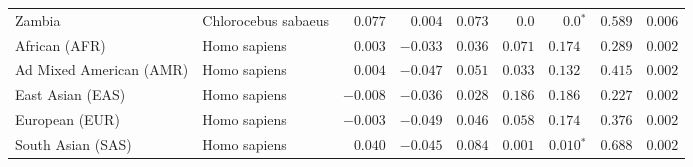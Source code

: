 \begin{center}
\begin{adjustbox}{width = 1\textwidth}
\begin{tabular}{|l|l|r|r|r|r|r|r|r|}
            Zambia        & Chlorocebus sabaeus        & $ 0.077$ & $ 0.004$ & $ 0.073$ & $0.0$ & $\bm{0.0{^*}}$ & $ 0.589$ & $ 0.006$ \\
            African (AFR)               & Homo sapiens        & $ 0.003$ & $-0.033$ & $ 0.036$ & $ 0.071$ & $ 0.174~~$        & $ 0.289$ & $ 0.002$ \\
            Ad Mixed American (AMR)                 & Homo sapiens        & $ 0.004$ & $-0.047$ & $ 0.051$ & $ 0.033$ & $ 0.132~~$        & $ 0.415$ & $ 0.002$ \\
            East Asian (EAS)              & Homo sapiens        & $-0.008$ & $-0.036$ & $ 0.028$ & $ 0.186$ & $ 0.186~~$ & $ 0.227$ & $ 0.002$ \\
            European (EUR)              & Homo sapiens        & $-0.003$ & $-0.049$ & $ 0.046$ & $ 0.058$ & $ 0.174~~$ & $ 0.376$ & $ 0.002$ \\
            South Asian (SAS)              & Homo sapiens        & $ 0.040$ & $-0.045$ & $ 0.084$ & $ 0.001$ & $\bm{ 0.010{^*}}$ & $ 0.688$ & $ 0.002$ \\
            \bottomrule
        \end{tabular}
    \end{adjustbox}
    \newpage
\end{center}

